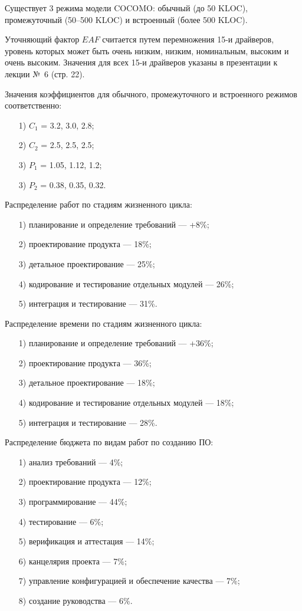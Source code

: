 \documentclass{bmstu}
\begin{document}
Существует 3 режима модели COCOMO: обычный (до 50 KLOC), промежуточный (50--500 KLOC) и встроенный (более 500 KLOC).

Уточняющий фактор $EAF$ считается путем перемножения 15-и драйверов, уровень которых может быть очень низким, низким, номинальным, высоким и очень высоким. 
Значения для всех 15-и драйверов указаны в презентации к лекции №~6 (стр. 22).

Значения коэффициентов для обычного, промежуточного и встроенного режимов соответственно:
\begin{enumerate}
\item[1)] $C_1$ = 3.2, 3.0, 2.8;
\item[2)] $C_2$ = 2.5, 2.5, 2.5;
\item[3)] $P_1$ = 1.05, 1.12, 1.2;
\item[3)] $P_2$ = 0.38, 0.35, 0.32.
\end{enumerate}

Распределение работ по стадиям жизненного цикла:
\begin{enumerate}
\item[1)] планирование и определение требований --- +8\%;
\item[2)] проектирование продукта --- 18\%;
\item[3)] детальное проектирование --- 25\%;
\item[4)] кодирование и тестирование отдельных модулей --- 26\%;
\item[5)] интеграция и тестирование --- 31\%.
\end{enumerate}

Распределение времени по стадиям жизненного цикла:
\begin{enumerate}
\item[1)] планирование и определение требований --- +36\%;
\item[2)] проектирование продукта --- 36\%;
\item[3)] детальное проектирование --- 18\%;
\item[4)] кодирование и тестирование отдельных модулей --- 18\%;
\item[5)] интеграция и тестирование --- 28\%.
\end{enumerate}

Распределение бюджета по видам работ по созданию ПО:
\begin{enumerate}
\item[1)] анализ требований --- 4\%;
\item[2)] проектирование продукта --- 12\%;
\item[3)] программирование --- 44\%;
\item[4)] тестирование --- 6\%;
\item[5)] верификация и аттестация --- 14\%;
\item[6)] канцелярия проекта --- 7\%;
\item[7)] управление конфигурацией и обеспечение качества --- 7\%;
\item[8)] создание руководства --- 6\%.
\end{enumerate}
\end{document}
